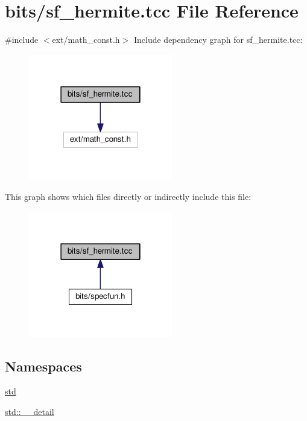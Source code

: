 \hypertarget{sf__hermite_8tcc}{}\section{bits/sf\+\_\+hermite.tcc File Reference}
\label{sf__hermite_8tcc}
{\ttfamily \#include $<$ext/math\+\_\+const.\+h$>$}\newline
Include dependency graph for sf\+\_\+hermite.\+tcc\+:
\nopagebreak
\begin{figure}[H]
\begin{center}
\leavevmode
\includegraphics[width=178pt]{sf__hermite_8tcc__incl}
\end{center}
\end{figure}
This graph shows which files directly or indirectly include this file\+:
\nopagebreak
\begin{figure}[H]
\begin{center}
\leavevmode
\includegraphics[width=178pt]{sf__hermite_8tcc__dep__incl}
\end{center}
\end{figure}
\subsection*{Namespaces}
\begin{DoxyCompactItemize}
\item 
 \hyperlink{namespacestd}{std}
\item 
 \hyperlink{namespacestd_1_1____detail}{std\+::\+\_\+\+\_\+detail}
\end{DoxyCompactItemize}
